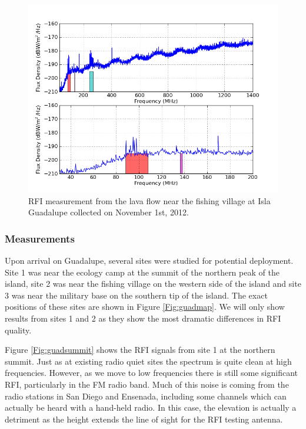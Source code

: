 \begin{figure}[htb]
\begin{center}
\includegraphics[width=0.9\linewidth]{RFI_testing/figures/GI_2__bands.png}
\caption{RFI measurement from the lava flow near the fishing village at Isla Guadalupe collected on November 1st, 2012.}
\label{Fig:guadlow}
\end{center}
\end{figure}

\subsubsection{Measurements}

Upon arrival on Guadalupe, several sites were studied for potential deployment. Site 1 was near the ecology camp at the summit of the northern peak of the island, site 2 was near the fishing village on the western side of the island and site 3 was near the military base on the southern tip of the island. The exact positions of these sites are shown in Figure \ref{Fig:guadmap}. We will only show results from sites 1 and 2 as they show the most dramatic differences in RFI quality. 

Figure \ref{Fig:guadsummit} shows the RFI signals from site 1 at the northern summit. Just as at existing radio quiet sites the spectrum is quite clean at high frequencies. However, as we move to low frequencies there is still some significant RFI, particularly in the FM radio band. Much of this noise is coming from the radio stations in San Diego and Ensenada, including some channels which can actually be heard with a hand-held radio. In this case, the elevation is actually a detriment as the height extends the line of sight for the RFI testing antenna. 

